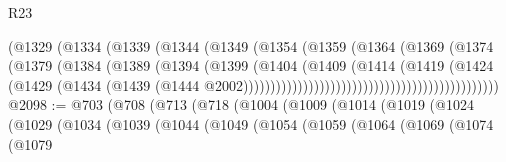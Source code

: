 \begin{lexlean}{R23}
\begin{coremodule}
{{{{{{{{{{{{{{{{{{{{{                                                  (@1329
                                                    (@1334
                                                      (@1339
                                                        (@1344
                                                          (@1349
                                                            (@1354
                                                              (@1359
                                                                (@1364
                                                                  (@1369
                                                                    (@1374
                                                                      (@1379
                                                                        (@1384
                                                                          (@1389
                                                                            (@1394
                                                                              (@1399
                                                                                (@1404
                                                                                  (@1409
                                                                                    (@1414
                                                                                      (@1419
                                                                                        (@1424
                                                                                          (@1429
                                                                                            (@1434
                                                                                              (@1439
                                                                                                (@1444
                                                                                                  @2002)))))))))))))))))))))))))))))))))))))))))))))))
@2098 := @703
    (@708
      (@713
        (@718
          (@1004
            (@1009
              (@1014
                (@1019
                  (@1024
                    (@1029
                      (@1034
                        (@1039
                          (@1044
                            (@1049
                              (@1054
                                (@1059
                                  (@1064
                                    (@1069
                                      (@1074
                                        (@1079
}}}}}}}}}}}}}}}}}}}}}
\end{coremodule}
\end{lexlean}
